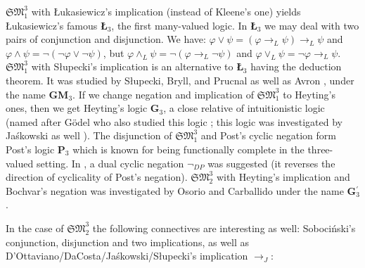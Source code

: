 \documentclass[11pt,a4paper,titlepage]{article}
\theoremstyle{definition}
\newcommand{\3}{\vspace{.3in}}
\newcommand{\2}{\vspace{.2in}}
\newcommand{\1}{\vspace{.1in}}
\newcommand{\5}{\vspace{.05in}}
\begin{document}
$\mathfrak{SM}_1^3$ with \L ukasiewicz's implication (instead of Kleene's one) yields \L ukasiewicz's famous {\bf \L$_3$}, the first many-valued logic. In {\bf \L$_3$} we may deal with two pairs of conjunction and disjunction.  
We have: $ \varphi\vee\psi=(\varphi\rightarrow_L\psi)\rightarrow_L\psi $ and $\varphi\wedge\psi=\neg(\neg\varphi\vee\neg\psi)  $, but $  \varphi\wedge_L\psi=\neg(\varphi\rightarrow_L\neg \psi)$ and $ \varphi\vee_L\psi=\neg \varphi\rightarrow_L \psi$. $\mathfrak{SM}_1^3$ with S\l upecki's implication is an alternative to {\bf \L$_3$} having the deduction theorem. It was studied by S\l{}upecki, Bryll, and Prucnal \cite{Slupecki67} as well as Avron  \cite{Avron}, under the name {\bf GM$_3$}. If we change negation and implication of $\mathfrak{SM}_1^3$ to Heyting's ones, then we get Heyting's \cite{Heyting} logic {\bf G$_3$}, a close relative of intuitionistic logic (named after G\"{o}del who also studied this logic \cite{Godel}; this logic was investigated by Ja\'{s}kowski as well \cite{Jaskowski}). 
The disjunction of $\mathfrak{SM}_1^3$ and Post's cyclic negation form Post's logic {\bf P$_3$} \cite{Post21} which is known for being functionally complete in the three-valued setting. In \cite{PetrukhinP}, a dual cyclic negation $ \neg_{\mathit{DP}} $ was suggested (it reverses the direction of cyclicality of Post's negation). $\mathfrak{SM}_2^3$ with Heyting's implication and Bochvar's negation was investigated by Osorio and Carballido \cite{OsorioCarballido08} under the name {\bf G}$_3^\prime$. 

In the case of $\mathfrak{SM}_2^3$ the following connectives are interesting as well: Soboci\'nski's \cite{Sobocinski} conjunction, disjunction and two implications, as well as D'Ottaviano/DaCosta/Ja\'{s}kowski/S\l{}upecki's \cite{DOttavianodaCosta,Jaskowski48,Slupecki39} implication $\rightarrow_J$:
\end{document}

